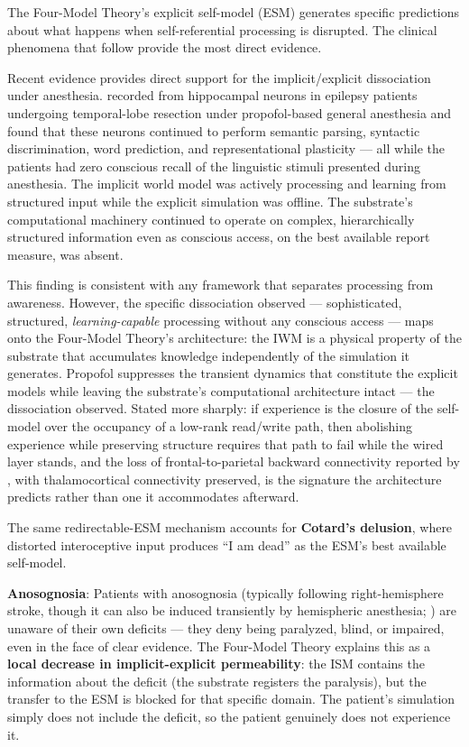 \documentclass[12pt]{article}
\newcommand{\revstart}{}
\newcommand{\revend}{}
\begin{document}
{\revstart The Four-Model Theory's explicit self-model (ESM) generates specific predictions about what happens when self-referential processing is disrupted. The clinical phenomena that follow provide the most direct evidence.

Recent evidence provides direct support for the implicit/explicit dissociation under anesthesia. \citet{Katlowitz2026} recorded from hippocampal neurons in epilepsy patients undergoing temporal-lobe resection under propofol-based general anesthesia and found that these neurons continued to perform semantic parsing, syntactic discrimination, word prediction, and representational plasticity --- all while the patients had zero conscious recall of the linguistic stimuli presented during anesthesia. The implicit world model was actively processing and learning from structured input while the explicit simulation was offline. The substrate's computational machinery continued to operate on complex, hierarchically structured information even as conscious access, on the best available report measure, was absent.

This finding is consistent with any framework that separates processing from awareness. However, the specific dissociation observed --- sophisticated, structured, \emph{learning-capable} processing without any conscious access --- maps onto the Four-Model Theory's architecture: the IWM is a physical property of the substrate that accumulates knowledge independently of the simulation it generates. Propofol suppresses the transient dynamics that constitute the explicit models while leaving the substrate's computational architecture intact --- the dissociation \citet{Katlowitz2026} observed. Stated more sharply: if experience is the closure of the self-model over the occupancy of a low-rank read/write path, then abolishing experience while preserving structure requires that path to fail while the wired layer stands, and the loss of frontal-to-parietal backward connectivity reported by \citet{Boly2012}, with thalamocortical connectivity preserved, is the signature the architecture predicts rather than one it accommodates afterward.

The same redirectable-ESM mechanism accounts for \textbf{Cotard's delusion}, where distorted interoceptive input produces ``I am dead'' as the ESM's best available self-model.\revend}

\textbf{Anosognosia}: Patients with anosognosia (typically following right-hemisphere stroke, though it can also be induced transiently by hemispheric anesthesia; \citealp{Gilmore1992}) are unaware of their own deficits --- they deny being paralyzed, blind, or impaired, even in the face of clear evidence. The Four-Model Theory explains this as a \textbf{local decrease in implicit-explicit permeability}: the ISM contains the information about the deficit (the substrate registers the paralysis), but the transfer to the ESM is blocked for that specific domain. The patient's simulation simply does not include the deficit, so the patient genuinely does not experience it.
\end{document}
